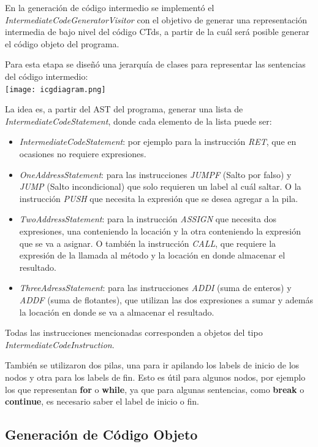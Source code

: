 \documentclass[11pt,a4paper]{article}
\begin{document}
En la generación de código intermedio se implementó el \textit{IntermediateCodeGeneratorVisitor} con el objetivo de generar una representación intermedia de bajo nivel del código CTds, a partir de la cuál será posible generar el código objeto del programa. 

Para esta etapa se diseñó una jerarquía de clases para representar las sentencias del código intermedio:
\\

\texttt{[image: icgdiagram.png]}

La idea es, a partir del AST del programa, generar una lista de  \textit{IntermediateCodeStatement}, donde cada elemento de la lista puede ser:
\begin{itemize}
\item \textit{IntermediateCodeStatement}: por ejemplo para la instrucción \textit{RET}, que en ocasiones no requiere expresiones.
\item \textit{OneAddressStatement}: para las instrucciones \textit{JUMPF} (Salto por falso) y \textit{JUMP} (Salto incondicional) que solo requieren un label al cuál saltar. O la instrucción \textit{PUSH} que necesita la expresión que se desea agregar a la pila. 
\item \textit{TwoAddressStatement}: para la instrucción \textit{ASSIGN} que necesita dos expresiones, una conteniendo la locación y la otra conteniendo la expresión que se va a asignar. O también la instrucción \textit{CALL}, que requiere la expresión de la llamada al método y la locación en donde almacenar el resultado.
\item \textit{ThreeAdressStatement}: para las instrucciones \textit{ADDI} (suma de enteros) y \textit{ADDF} (suma de flotantes), que utilizan las dos expresiones a sumar y además la locación en donde se va a almacenar el resultado.
\end{itemize}

Todas las instrucciones mencionadas corresponden a objetos del tipo \textit{IntermediateCodeInstruction}.

También se utilizaron dos pilas, una para ir apilando los labels de inicio de los nodos y otra para los labels de fin. Esto es útil para algunos nodos, por ejemplo los que representan \textbf{for} o \textbf{while}, ya que para algunas sentencias, como \textbf{break} o \textbf{continue}, es necesario saber el label de inicio o fin. 

\subsection{Generación de Código Objeto} 
\label{subsec:genco}
\end{document}
